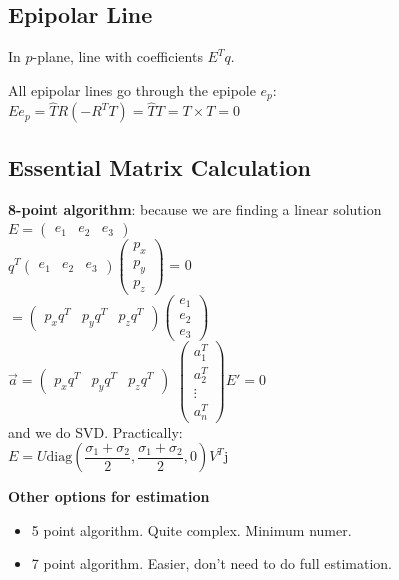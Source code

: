 \subsection*{Epipolar Line}
In $p$-plane, line with coefficients $E^T q$.

All epipolar lines go through the epipole $e_p$:\\
$E e_p = \hat{T} R (-R^T T) = \hat{T}T = T \times T = 0$

\subsection*{Essential Matrix Calculation}
\textbf{8-point algorithm}: because we are finding a linear solution\\
$E = \begin{pmatrix}e_1 & e_2 & e_3 \end{pmatrix}$\\
$q^T \begin{pmatrix}e_1 & e_2 & e_3 \end{pmatrix}
\begin{pmatrix}p_x \\ p_y \\ p_z \end{pmatrix}$ = 0\\
$= \begin{pmatrix}p_x q^T & p_y q^T&p_z q^T \end{pmatrix}
\begin{pmatrix}e_1 \\ e_2 \\ e_3 \end{pmatrix}$\\
$\vec{a} = \begin{pmatrix}p_x q^T & p_y q^T&p_z q^T \end{pmatrix}$
$\begin{pmatrix} a_1^T \\ a_2^T \\ \vdots \\ a_n^T \end{pmatrix} E' =
0$\\
and we do SVD. Practically: \\
$E = U \text{diag}\left(\dfrac{\sigma_1 + \sigma_2}{2}, \dfrac{\sigma_1
+ \sigma_2}{2}, 0 \right) V^T$j

\textbf{Other options for estimation}
\begin{itemize}
  \item 5 point algorithm. Quite complex. Minimum numer.
  \item 7 point algorithm. Easier, don't need to do full estimation.
\end{itemize}

